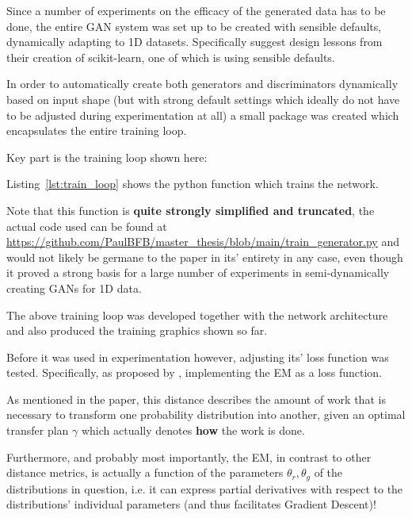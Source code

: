 Since a number of experiments on the efficacy of the generated data has to be done, the entire \ac{GAN} system was set up to be created with sensible defaults, dynamically adapting to 1D datasets. 
Specifically \cite{buitinck2013api} suggest design lessons from their creation of scikit-learn, one of which is using sensible defaults.

In order to automatically create both generators and discriminators dynamically based on input shape (but with strong default settings which ideally do not have to be adjusted during experimentation at all) a small package was created which encapsulates the entire training loop.

\pagebreak

Key part is the training loop shown here:



\pagebreak

Listing~\ref{lst:train_loop} shows the python function which trains the network. 

Note that this function is \textbf{quite strongly simplified and truncated}, 
the actual code used can be found at \url{https://github.com/PaulBFB/master_thesis/blob/main/train_generator.py} and would not likely be germane to the paper in its' entirety in any case, even though it proved a strong basis for a large number of experiments in semi-dynamically creating \acp{GAN} for 1D data.

The above training loop was developed together with the network architecture and also produced the training graphics shown so far. 

Before it was used in experimentation however, adjusting its' loss function was tested.
Specifically, as proposed by \cite{arjovsky2017wasserstein}, implementing the \ac{EM} as a loss function. 


As mentioned in the paper, this distance describes the amount of work that is necessary to transform one probability distribution into another, given an optimal transfer plan $\gamma$ which actually denotes \textbf{how} the work is done.

Furthermore, and probably most importantly, the \ac{EM}, in contrast to other distance metrics, is actually a function of the parameters $\theta_{r}, \theta_{g}$  of the distributions in question, i.e. it can express partial derivatives with respect to the distributions' individual parameters (and thus facilitates Gradient Descent)!


